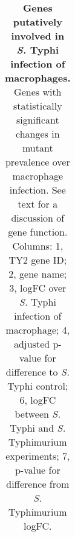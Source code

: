 %
\begin{table}
   \centering
   \noindent
    \caption[Genes putatively involved in {\it S.} Typhi infection of macrophages]{\textbf{Genes putatively involved in {\it S.} Typhi infection of macrophages.} Genes with statistically significant changes in mutant prevalence over macrophage infection. See text for a discussion of gene function.  Columns: 1, TY2 gene ID; 2, gene name; 3, logFC over {\it S.} Typhi infection of macrophage; 4, adjusted p-value for difference to {\it S.} Typhi control; 6, logFC between {\it S.} Typhi and {\it S.} Typhimurium experiments; 7, p-value for difference from {\it S.} Typhimurium logFC. }
    \begin{tabular}{ l
    				l
				r
    				c
				r
				c
				}
   

\end{tabular}
\end{table}
